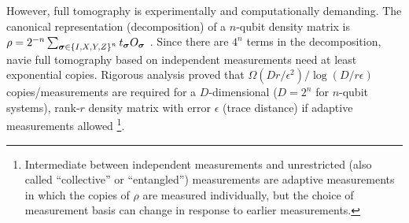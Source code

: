 \documentclass[
reprint,
aps,
pra,
floatfix,
]{revtex4-2}
\theoremstyle{plain}
\theoremstyle{definition}
\newcommand{\ob}{O}
\newcommand{\dm}{\rho}
\newcommand{\bmsigma}{\bm{\sigma}}
\begin{document}
However, full tomography is experimentally and computationally demanding.
The canonical representation (decomposition) of a $n$-qubit density matrix
is $\dm=2^{-n} \sum_{\bmsigma \in \qty{I,X,Y,Z}^n} t_{\bmsigma}  \ob_{\bmsigma} $  
\cite{altepeterPhotonicStateTomography2005}.
Since there are $4^n$ terms in the decomposition, navie full tomography based on independent measurements need at least exponential copies.
Rigorous analysis \cite{haahSampleoptimalTomographyQuantum2017} \cite{odonnellEfficientQuantumTomography2016} proved that $\Omega(Dr/\epsilon^2)/\log(D/r\epsilon)$ copies/measurements are required for a $D$-dimensional ($D=2^n$ for $n$-qubit systems), rank-$r$ density matrix with error $\epsilon$ (trace distance) if adaptive measurements allowed 
\footnote{Intermediate between independent measurements and unrestricted (also called “collective” or “entangled”) measurements are adaptive measurements in which the copies of $\dm$ are measured individually, but the choice of measurement basis can change in response to earlier measurements.}.
\end{document}
